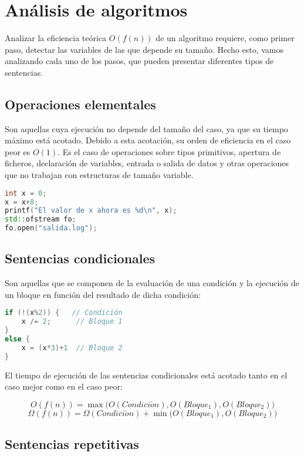 \section{Análisis de algoritmos}

Analizar la eficiencia teórica $O(f(n))$ de un algoritmo requiere, como primer paso, detectar las variables de las que depende su tamaño.
Hecho esto, vamos analizando cada uno de los pasos, que pueden presentar diferentes tipos de sentencias.

\subsection{Operaciones elementales}

Son aquellas cuya ejecución no depende del tamaño del caso, ya que su tiempo máximo está acotado.
Debido a esta acotación, su orden de eficiencia en el caso peor es $O(1)$.
Es el caso de operaciones sobre tipos primitivos, apertura de ficheros, declaración de variables, entrada o salida de datos y otras operaciones que no trabajan con estructuras de tamaño variable.

\begin{lstlisting}[language=C++]
int x = 0;
x = x+8;
printf("El valor de x ahora es %d\n", x);
std::ofstream fo;
fo.open("salida.log");
\end{lstlisting}

\subsection{Sentencias condicionales}\label{condicionales}

Son aquellas que se componen de la evaluación de una condición y la ejecución de un bloque en función del resultado de dicha condición:

\begin{lstlisting}[language=C]
if (!(x%2)) {   // Condición
	x /= 2;      // Bloque 1
}
else {
	x = (x*3)+1  // Bloque 2
}
\end{lstlisting}

El tiempo de ejecución de las sentencias condicionales está acotado tanto en el caso mejor como en el caso peor:

\[O(f(n))=\max\big(O(Condici\acute{o}n),O(Bloque_1),O(Bloque_2)\big)\]
\[\Omega(f(n))=\Omega(Condici\acute{o}n)+\min\big(O(Bloque_1),O(Bloque_2)\big)\]

\subsection{Sentencias repetitivas}\label{repetitivas}

